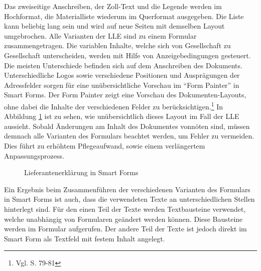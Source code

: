 	Das zweiseitige Anschreiben, der Zoll-Text und die Legende werden im Hochformat, die Materialliste wiederum im Querformat ausgegeben. Die Liste kann beliebig lang sein und wird auf neue Seiten mit demselben Layout umgebrochen. Alle Varianten der \ac{LLE} sind zu einem Formular zusammengetragen. Die variablen Inhalte, welche sich von Gesellschaft zu Gesellschaft unterscheiden, werden mit Hilfe von Anzeigebedingungen gesteuert. Die meisten Unterschiede befinden sich auf dem Anschreiben des Dokuments. Unterschiedliche Logos sowie verschiedene Positionen und Ausprägungen der Adressfelder sorgen für eine unübersichtliche Vorschau im "`Form Painter"' in Smart Forms. Der Form Painter zeigt eine Vorschau des Dokumenten-Layouts, ohne dabei die Inhalte der verschiedenen Felder zu berücksichtigen.\footnote{Vgl. \cite{Hertleif.2003} S. 79-81}
	In Abbildung \ref{fig2} ist zu sehen, wie unübersichtlich dieses Layout im Fall der \ac{LLE} aussieht. Sobald Änderungen am Inhalt des Dokumentes vonnöten sind, müssen demnach alle Varianten des Formulars beachtet werden, um Fehler zu vermeiden. Dies führt zu erhöhtem Pflegeaufwand, sowie einem verlängertem Anpassungsprozess.
	
	\begin{figure}[ht]
		\centering
		\caption{Lieferantenerklärung in Smart Forms}
		\label{fig2}
	\end{figure}
	
	Ein Ergebnis beim Zusammenführen der verschiedenen Varianten des Formulars in Smart Forms ist auch, dass die verwendeten Texte an unterschiedlichen Stellen hinterlegt sind. Für den einen Teil der Texte werden Textbausteine verwendet, welche unabhängig von Formularen geändert werden können. Diese Bausteine werden im Formular aufgerufen. Der andere Teil der Texte ist jedoch direkt im Smart Form als Textfeld mit festem Inhalt angelegt. 
	
